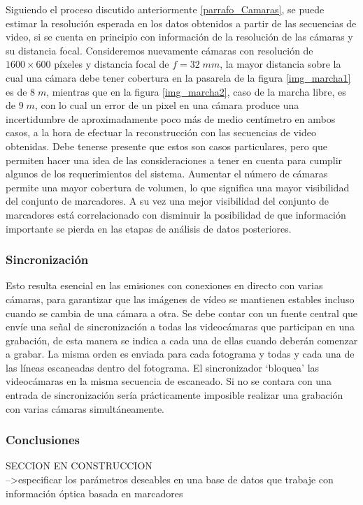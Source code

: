 Siguiendo el proceso discutido anteriormente \ref{parrafo_Camaras}, se puede estimar la resolución esperada en los datos obtenidos a partir de las secuencias de video, si se cuenta en principio con información de la resolución de las cámaras y su distancia focal. Consideremos nuevamente cámaras con resolución de $1600\times600$ píxeles y distancia focal de $f=32\;mm$, la mayor distancia sobre la cual una cámara debe tener cobertura en la pasarela de la figura \ref{img_marcha1} es de $8 \;m$, mientras que en la figura  \ref{img_marcha2}, caso de la marcha libre, es de $9\;m$, con lo cual un error de un pixel en una cámara produce una incertidumbre de aproximadamente poco más de medio centímetro en ambos casos, a la hora de efectuar la reconstrucción con las secuencias de video obtenidas. 
Debe tenerse presente que estos son casos particulares, pero que permiten hacer una idea de las consideraciones a tener en cuenta para cumplir algunos de los requerimientos del sistema. 
Aumentar el número de cámaras permite una mayor cobertura de volumen, lo que significa una mayor visibilidad del conjunto de marcadores. A su vez una mejor visibilidad del conjunto de marcadores está correlacionado con disminuir la posibilidad de que información importante se pierda en las etapas de análisis de datos posteriores.


\subsubsection{Sincronización \cite{canon}} 

Esto resulta esencial en las emisiones con conexiones en directo con varias cámaras, para garantizar que las imágenes de vídeo se mantienen estables incluso cuando se cambia de una cámara a otra.
Se debe contar con un fuente central que envíe una señal de sincronización a todas las videocámaras que participan en una grabación, de esta manera se indica a cada una de ellas cuando deberán comenzar a grabar. La misma orden es enviada para cada fotograma y todas y cada una de las líneas escaneadas dentro del fotograma. El sincronizador ‘bloquea’ las videocámaras en la misma secuencia de escaneado.
Si no se contara con una entrada de sincronización sería prácticamente imposible realizar una grabación con varias cámaras simultáneamente.





\subsubsection{Conclusiones} SECCION EN CONSTRUCCION\\
-->especificar los parámetros deseables en una base de datos que trabaje con información óptica basada en marcadores


